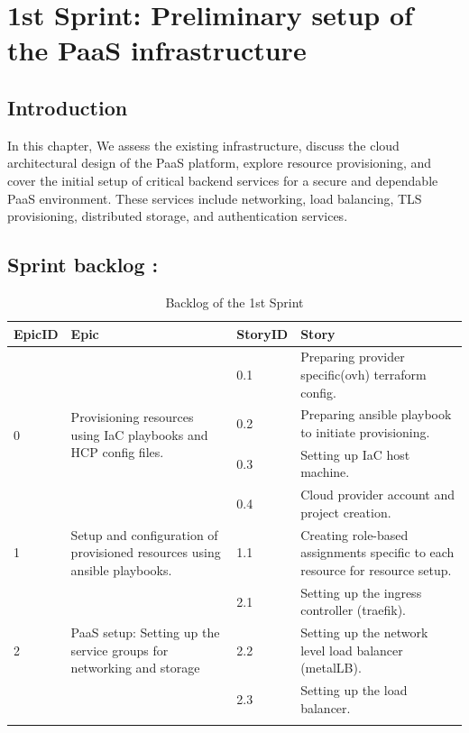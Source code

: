 \graphicspath{{./assets/}}
\setcounter{mtc}{2}
\chapter{1st Sprint: Preliminary setup of the PaaS infrastructure  }

\section*{Introduction}

\hspace{7mm}In this chapter, We assess the existing infrastructure, discuss the cloud architectural design of the PaaS platform, explore resource provisioning, and cover the initial setup of critical backend services for a secure and dependable PaaS environment. These services include networking, load balancing, TLS provisioning, distributed storage, and authentication services.

\section{Sprint backlog :}

\begin{longtable}[ht]{|m{1.5cm}|m{4cm}|m{1.5cm}|m{7cm}|}
\hline
{\textbf{EpicID}} & {\textbf{Epic}} & {\textbf{StoryID}} & {\textbf{Story}} \\
\endhead
\hline
\multirow{4}{1.5cm}{0} & \multirow{4}{4cm}{\raggedright Provisioning resources using IaC playbooks and HCP config files.}  &  0.1	 & Preparing provider specific(ovh) terraform config. \\
\cline{3-4}
& & 0.2 & Preparing ansible playbook to initiate provisioning. \\
\cline{3-4}
& & 0.3	& Setting up IaC host machine.  \\
\cline{3-4}
& & 0.4	& Cloud provider account and project creation.  \\
\hline
1  & Setup and configuration of provisioned resources using ansible playbooks.	 &  1.1	 &  Creating role-based assignments specific to each resource for resource setup. \\
\hline
\multirow{3}{1.5cm}{2} & \multirow{3}{4cm}{\raggedright PaaS setup: Setting up the service groups for networking and storage}	 &  2.1	 &  Setting up the ingress controller (traefik).\\
\cline{3-4}
& & 2.2 & Setting up the network level load balancer (metalLB). \\
\cline{3-4}
& & 2.3	& Setting up the load balancer. \\
\cline{3-4}
\hline
\caption{Backlog of the 1st Sprint}
\end{longtable}

